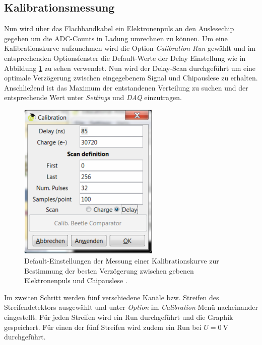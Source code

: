 \subsection{Kalibrationsmessung}
\label{sec:Kalibrationsmessung}
Nun wird über das Flachbandkabel ein Elektronenpuls an den Auslesechip gegeben
um die ADC-Counts in Ladung umrechnen zu können. Um eine Kalibrationskurve
aufzunehmen wird die Option \textit{Calibration Run} gewählt und im entsprechenden
Optionsfenster die Default-Werte der Delay Einstellung wie in Abbildung
\ref{fig:calibration} zu sehen verwendet. Nun wird der Delay-Scan durchgeführt
um eine optimale Verzögerung zwischen eingegebenem Signal und Chipauslese zu
erhalten. Anschließend ist das Maximum der entstandenen Verteilung zu suchen und
der entsprechende Wert unter \textit{Settings} und \textit{DAQ} einzutragen.
\begin{figure}[htb]
  \centering
  \includegraphics[width=0.6\textwidth]{images/Calibration.png}
  \caption{Default-Einstellungen der Messung einer Kalibrationskurve zur Bestimmung der besten Verzögerung zwischen gebenen Elektronenpuls und Chipauslese \cite{anleitung}.}
  \label{fig:calibration}
\end{figure}

Im zweiten Schritt werden fünf verschiedene Kanäle bzw. Streifen des Streifendetektors
ausgewählt und unter \textit{Option} im \textit{Calibration}-Menü nacheinander
eingestellt. Für jeden Streifen wird ein Run durchgeführt und die Graphik gespeichert.
Für einen der fünf Streifen wird zudem ein Run bei $U=\SI{0}{\volt}$ durchgeführt.


